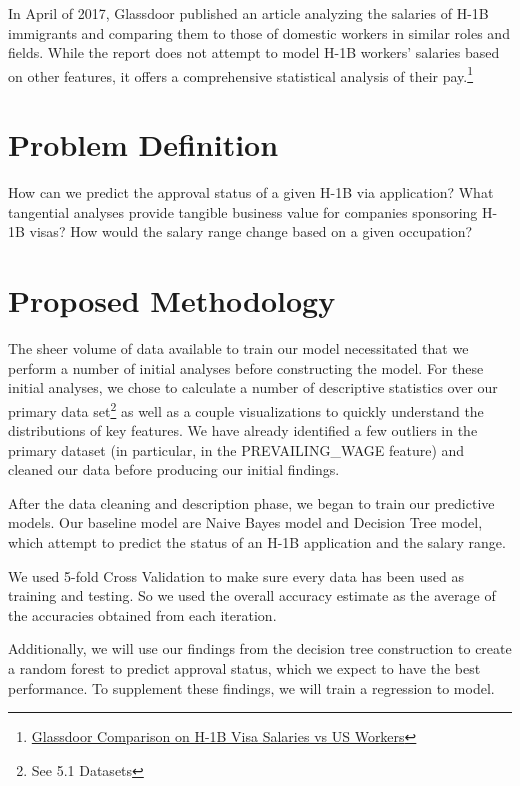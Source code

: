 \documentclass[sigconf]{acmart}
\begin{document}
In April of 2017, Glassdoor published an article analyzing the salaries of H-1B immigrants and
comparing them to those of domestic workers in similar roles and fields. While the report does not
attempt to model H-1B workers’ salaries based on other features, it offers a comprehensive
statistical analysis of their pay.\footnote{\href{https://www.glassdoor.com/research/h1b-workers/}{Glassdoor Comparison on H-1B Visa Salaries vs US Workers}}


\section{Problem Definition}

How can we predict the approval status of a given H-1B via application? What tangential analyses
provide tangible business value for companies sponsoring H-1B visas? How would the salary range
change based on a given occupation?


\section{Proposed Methodology}

The sheer volume of data available to train our model necessitated that we perform a number of
initial analyses before constructing the model. For these initial analyses, we chose to
calculate a number of descriptive statistics over our primary data set\footnote{See 5.1 Datasets} as
well as a couple visualizations to quickly understand the distributions of key features. We have
already identified a few outliers in the primary dataset (in particular, in the PREVAILING\_WAGE
feature) and cleaned our data before producing our initial findings.

After the data cleaning and description phase, we began to train our predictive models. Our baseline
model are Naive Bayes model and Decision Tree model, which attempt to predict the status of an H-1B
application and the salary range.

We used 5-fold Cross Validation to make sure every data has been used as training and testing. So we
used the overall accuracy estimate as the average of the accuracies obtained from each iteration.

Additionally, we will use our findings from the decision tree construction to create a random forest
to predict approval status, which we expect to have the best performance. To supplement these
findings, we will train a regression to model.
\end{document}
